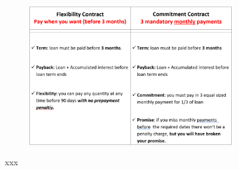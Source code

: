 \documentclass[11pt]{article}
\begin{document}
\begin{figure}[H]
     \caption{Explanatory Material: Promise-Choice Days}
    \label{ExplanatoryMaterial}
    \begin{center}
    \begin{subfigure}{0.8\textwidth}
        \centering
        \includegraphics[width=\textwidth]{Figuras/MicaChoiceDonde.png}
    \end{subfigure}
    \end{center}
    \scriptsize
        xxx
\end{figure}
\end{document}
